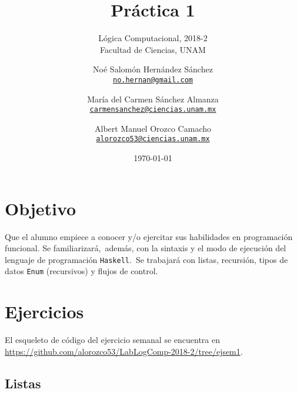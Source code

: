 \documentclass[paper=letter, fontsize=12pt]{scrartcl}
\title{Práctica 1}
\subtitle{
  Lógica Computacional, 2018-2\\
  Facultad de Ciencias, UNAM
}
\author{
  \normalsize
  Noé Salomón Hernández Sánchez\\
  \normalsize
  \texttt{\href{mailto:no.hernan@gmail.com}{no.hernan@gmail.com}}
  \and
  \normalsize
  María del Carmen Sánchez Almanza\\
  \normalsize
  \texttt{\href{mailto:carmensanchez@ciencias.unam.mx}{carmensanchez@ciencias.unam.mx}}
  \and
  \normalsize
  Albert Manuel Orozco Camacho\\
  \normalsize
  \texttt{\href{mailto:alorozco53@ciencias.unam.mx}{alorozco53@ciencias.unam.mx}}
}
\date{\today}
\begin{document}
\maketitle

\section{Objetivo}

\noindent
Que el alumno empiece a conocer y/o ejercitar sus habilidades en programación funcional. Se familiarizará,\
además, con la sintaxis y el modo de ejecución del lenguaje de programación \verb+Haskell+.\
Se trabajará con listas, recursión, tipos de datos \verb+Enum+ (recursivos) y flujos de control.

\section{Ejercicios}

\noindent
El esqueleto de código del ejercicio semanal se encuentra en \url{https://github.com/alorozco53/LabLogComp-2018-2/tree/ejsem1}.

\subsection{Listas}
\end{document}
